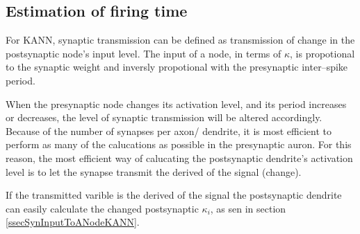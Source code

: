 



	\subsection{Estimation of firing time}
	For KANN, synaptic transmission can be defined as transmission of change in the postsynaptic node's input level.
	The input of a node, in terms of $\kappa$, is propotional to the synaptic weight and inversly propotional with the presynaptic inter--spike period.

	When the presynaptic node changes its activation level, and its period increases or decreases, the level of synaptic transmission will be altered accordingly. 
	Because of the number of synapses per axon/ dendrite, it is most efficient to perform as many of the calucations as possible in the presynaptic auron.
	For this reason, the most efficient way of calucating the postsynaptic dendrite's activation level is to let the synapse transmit the derived of the signal (change).

	If the transmitted varible is the derived of the signal the postsynaptic dendrite can easily calculate the changed postsynaptic $\kappa_i$, as sen in section \ref{ssecSynInputToANodeKANN}.
	
